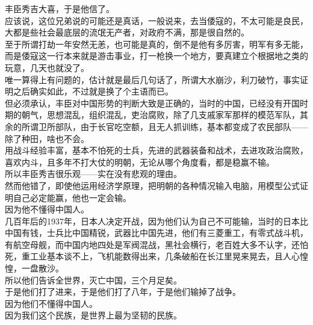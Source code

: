 \begin{multicols}{\theparacolNo}
丰臣秀吉大喜，于是他信了。\\

应该说，这位兄弟说的可能还是真话，一般说来，去当倭寇的，不太可能是良民，大都是些社会最底层的流氓无产者，对政府不满，那是很自然的。\\

至于所谓打劫一年安然无恙，也可能是真的，倒不是他有多厉害，明军有多无能，而是倭寇这一行本来就是游击事业，打一枪换一个地方，要真建立个根据地之类的玩意，几天也就没了。\\

唯一算得上有问题的，估计就是最后几句话了，所谓大水崩沙，利刀破竹，事实证明之后确实如此，不过就是换了个主语而已。\\

但必须承认，丰臣对中国形势的判断大致是正确的，当时的中国，已经没有开国时期的朝气，思想混乱，组织混乱，吏治腐败，除了几支戚家军那样的模范军队，其余的所谓卫所部队，由于长官吃空额，且无人抓训练，基本都变成了农民部队——除了种田，啥也不会。\\

用战斗经验丰富，基本不怕死的士兵，先进的武器装备和战术，去进攻政治腐败，喜欢内斗，且多年不打大仗的明朝，无论从哪个角度看，都是稳赢不输。\\

所以丰臣秀吉很乐观——实在没有悲观的理由。\\

然而他错了，即使他运用经济学原理，把明朝的各种情况输入电脑，用模型公式证明自己必定能赢，他也一定会输。\\

因为他不懂得中国人。\\

几百年后的1937年，日本人决定开战，因为他们认为自己不可能输，当时的日本比中国有钱，士兵比中国精锐，武器比中国先进，他们有三菱重工，有零式战斗机，有航空母舰，而中国内地四处是军阀混战，黑社会横行，老百姓大多不认字，还怕死，重工业基本谈不上，飞机能数得出来，几条破船在长江里晃来晃去，且人心惶惶，一盘散沙。\\

所以他们告诉全世界，灭亡中国，三个月足矣。\\

于是他们打了进来，于是他们打了八年，于是他们输掉了战争。\\

因为他们不懂得中国人。\\

因为我们这个民族，是世界上最为坚韧的民族。\\


\end{multicols}
